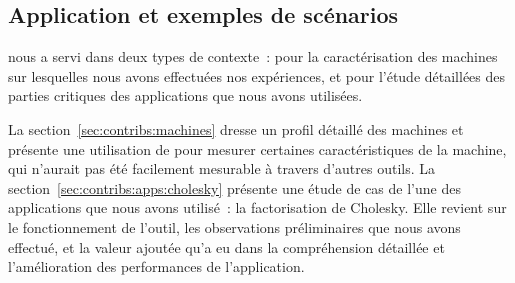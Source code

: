 \subsection{Application et exemples de scénarios}

\outil nous a servi dans deux types de contexte~: pour la caractérisation des machines sur lesquelles nous avons effectuées nos expériences, et pour l'étude détaillées des parties critiques des applications que nous avons utilisées.

La section~\ref{sec:contribs:machines} dresse un profil détaillé des machines et présente une utilisation de \outil pour mesurer certaines caractéristiques de la machine, qui n'aurait pas été facilement mesurable à travers d'autres outils.
La section~\ref{sec:contribs:apps:cholesky} présente une étude de cas de l'une des applications que nous avons utilisé~: la factorisation de Cholesky.
Elle revient sur le fonctionnement de l'outil, les observations préliminaires que nous avons effectué, et la valeur ajoutée qu'a eu \outil dans la compréhension détaillée et l'amélioration des performances de l'application.



